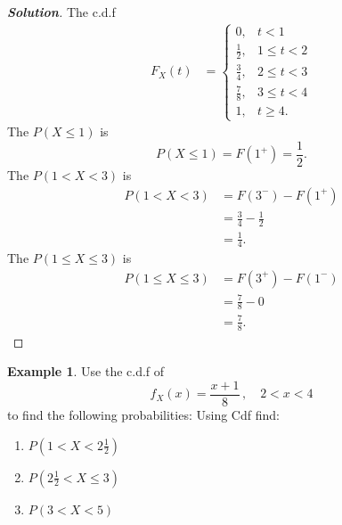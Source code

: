 \documentclass[12pt,a4paper]{report}
\theoremstyle{definition}
\newtheorem{example}[thm]{Example}
\theoremstyle{plain}
\theoremstyle{definition}
\begin{document}
\begin{proof}[\textbf{\textit{Solution}}]
The c.d.f
\begin{align*}
F_X(t) & = \begin{cases}
0, & t < 1\\
\frac{1}{2}, & 1\leq t < 2\\
\frac{3}{4}, & 2\leq t < 3\\
\frac{7}{8}, & 3 \leq t < 4\\
1, & t\geq 4.
\end{cases}
\end{align*}
The $P(X\leq 1)$ is \[P(X\leq 1) = F(1^+)  = \frac{1}{2}.\]
The $P(1 < X < 3)$ is
\begin{align*}
P(1 < X < 3) & = F(3^-) - F(1^+)\\
& = \frac{3}{4}-\frac{1}{2}\\
&=\frac{1}{4}.
\end{align*}
The $P(1\leq X \leq 3)$ is 
\begin{align*}
P(1 \leq X \leq 3) & = F(3^+) - F(1^-)\\
& = \frac{7}{8}-0\\
& = \frac{7}{8}.
\end{align*}
\end{proof}



\begin{example}
Use the c.d.f of 
\[f_X(x)=\frac{x+1}{8}\, ,\quad 2<x<4\]
to find the following probabilities: 
Using Cdf find:
\begin{enumerate}
\item[(i).] $P(1< X <2\frac{1}{2})$
\item[(ii).] $P(2\frac{1}{2}< X \leq 3)$
\item[(iii).] $P(3< X <5)$
\end{enumerate}
\end{example}
\end{document}
